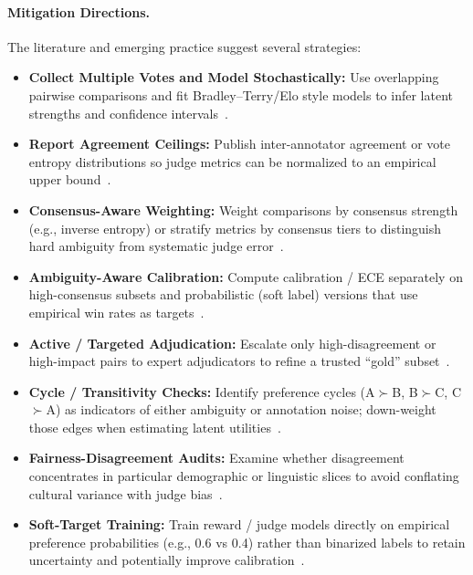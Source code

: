 \paragraph{Mitigation Directions.} The literature and emerging practice suggest several strategies:
\begin{itemize}
	\item \textbf{Collect Multiple Votes and Model Stochastically:} Use overlapping pairwise comparisons and fit Bradley--Terry/Elo style models to infer latent strengths and confidence intervals~\cite{bradley1952rank, elo1978rating, stiennon2020learning, ouyang2022training, liu2024pairs}.
	\item \textbf{Report Agreement Ceilings:} Publish inter-annotator agreement or vote entropy distributions so judge metrics can be normalized to an empirical upper bound~\cite{bavaresco2024judgebench, li2024_llmsasjudges}.
	\item \textbf{Consensus-Aware Weighting:} Weight comparisons by consensus strength (e.g., inverse entropy) or stratify metrics by consensus tiers to distinguish hard ambiguity from systematic judge error~\cite{bavaresco2024judgebench}.
	\item \textbf{Ambiguity-Aware Calibration:} Compute calibration / ECE separately on high-consensus subsets and probabilistic (soft label) versions that use empirical win rates as targets~\cite{guo2017calibration, brier1950verification}.
	\item \textbf{Active / Targeted Adjudication:} Escalate only high-disagreement or high-impact pairs to expert adjudicators to refine a trusted ``gold'' subset~\cite{stiennon2020learning, ouyang2022training}.
	\item \textbf{Cycle / Transitivity Checks:} Identify preference cycles (A$\succ$B, B$\succ$C, C$\succ$A) as indicators of either ambiguity or annotation noise; down-weight those edges when estimating latent utilities~\cite{bradley1952rank, liu2024pairs}.
	\item \textbf{Fairness-Disagreement Audits:} Examine whether disagreement concentrates in particular demographic or linguistic slices to avoid conflating cultural variance with judge bias~\cite{hada2024metal, liang2022helm}.
	\item \textbf{Soft-Target Training:} Train reward / judge models directly on empirical preference probabilities (e.g., 0.6 vs 0.4) rather than binarized labels to retain uncertainty and potentially improve calibration~\cite{stiennon2020learning, ouyang2022training}.
\end{itemize}

